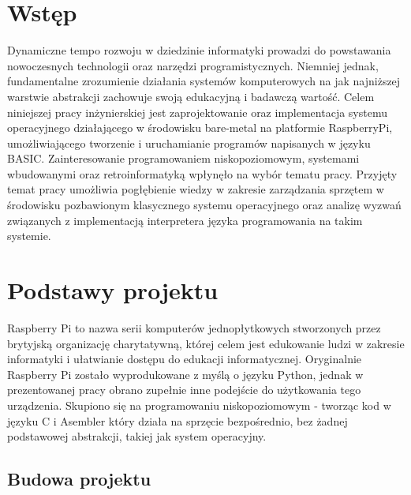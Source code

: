 \documentclass[shortabstract]{iithesis}
\author         {Aleksandra Kosińska \and Cezary Stajszczyk}
\date           {31 sierpnia 2023}                     %
\begin{document}

\chapter*{Wstęp}
Dynamiczne tempo rozwoju w dziedzinie informatyki prowadzi do powstawania nowoczesnych technologii oraz narzędzi programistycznych. Niemniej jednak, fundamentalne zrozumienie działania systemów komputerowych na jak najniższej warstwie abstrakcji zachowuje swoją edukacyjną i badawczą wartość.
Celem niniejszej pracy inżynierskiej jest zaprojektowanie oraz implementacja systemu operacyjnego działającego w środowisku bare-metal na platformie RaspberryPi, umożliwiającego tworzenie i uruchamianie programów napisanych w języku BASIC. Zainteresowanie programowaniem niskopoziomowym, systemami wbudowanymi oraz retroinformatyką wpłynęło na wybór tematu pracy.
Przyjęty temat pracy umożliwia pogłębienie wiedzy w zakresie zarządzania sprzętem w środowisku pozbawionym klasycznego systemu operacyjnego oraz analizę wyzwań związanych z implementacją interpretera języka programowania na takim systemie.


\chapter{Podstawy projektu}
Raspberry Pi to nazwa serii komputerów jednopłytkowych stworzonych przez brytyjską organizację charytatywną, której celem jest edukowanie ludzi w zakresie informatyki i ułatwianie dostępu do edukacji informatycznej. Oryginalnie Raspberry Pi zostało wyprodukowane z myślą o języku Python, jednak w prezentowanej pracy obrano zupełnie inne podejście do użytkowania tego urządzenia. Skupiono się na programowaniu niskopoziomowym - tworząc kod w języku C i Asembler który działa na sprzęcie bezpośrednio, bez żadnej podstawowej abstrakcji, takiej jak system operacyjny.

\section{Budowa projektu}
\end{document}
